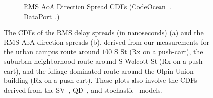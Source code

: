 \documentclass[10pt, twocolumn]{IEEEtran}
\begin{document}
{\begin{figure} [t]
\begin{subfigure}{0.496\linewidth}
        \caption{RMS AoA Direction Spread CDFs (\href{https://codeocean.com/capsule/9545863/tree}{CodeOcean}~\cite{CodeOcean}. \href{http://ieee-dataport.org/12580}{DataPort}~\cite{DataPort}.)}
        \label{F11b}
    \end{subfigure}
    \vspace{-5mm}
    \caption{The CDFs of the RMS delay spreads (in nanoseconds) (a) and the RMS AoA direction spreads (b), derived from our measurements for the urban campus route around $100$ S St (Rx on a push-cart), the suburban neighborhood route around S Wolcott St (Rx on a push-cart), and the foliage dominated route around the Olpin Union building (Rx on a push-cart). These plots also involve the CDFs derived from the SV~\cite{SV_Molisch}, QD~\cite{QDC_NIST}, and stochastic~\cite{Indoor60G} models.}
    \vspace{-6mm}
    \label{F11}
\end{figure}
\vspace{-3mm}

}
\end{document}
